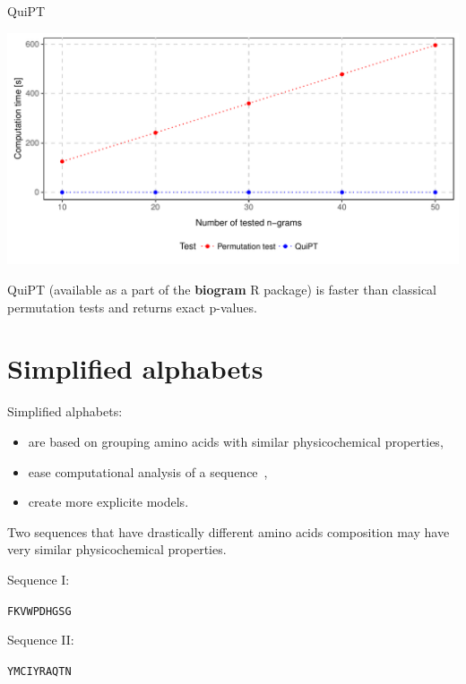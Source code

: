 \documentclass{beamer}\usepackage[]{graphicx}\usepackage[]{color}
\makeatletter
\def\maxwidth{ %
  \ifdim\Gin@nat@width>\linewidth
    \linewidth
  \else
    \Gin@nat@width
  \fi
}
\makeatother
\begin{document}
\begin{frame}{QuiPT}  


\includegraphics[width=\maxwidth]{figure/unnamed-chunk-6-1} 


QuiPT (available as a part of the \textbf{biogram} R package) is faster than classical permutation tests and returns exact p-values.
\end{frame}

\section{Simplified alphabets}

\begin{frame}
Simplified alphabets:
\begin{itemize}
\item are based on grouping amino acids with similar physicochemical properties,
\item ease computational analysis of a sequence~\citep{murphy_simplified_2000},
\item create more explicite models.
\end{itemize}
\end{frame}


\begin{frame}  
Two sequences that have drastically different amino acids composition may have very similar physicochemical properties.




Sequence I: 

\texttt{FKVWPDHGSG}

\medskip

Sequence II: 

\texttt{YMCIYRAQTN}

\end{frame}  
\end{document}
